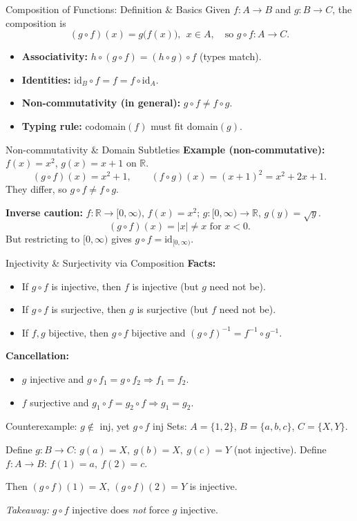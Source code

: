 \documentclass[11pt]{beamer}
\theoremstyle{plain}
\begin{document}
\begin{frame}{Composition of Functions: Definition \& Basics}
\small
Given $f:A\to B$ and $g:B\to C$, the composition is
\[
(g\circ f)(x)=g\bigl(f(x)\bigr),\ \ x\in A,\quad \text{so } g\circ f:A\to C.
\]
\begin{itemize}
  \item \textbf{Associativity:} $h\circ(g\circ f)=(h\circ g)\circ f$ (types match).
  \item \textbf{Identities:} $\mathrm{id}_B\circ f=f=f\circ\mathrm{id}_A$.
  \item \textbf{Non-commutativity (in general):} $g\circ f\neq f\circ g$.
  \item \textbf{Typing rule:} codomain$(f)$ must fit domain$(g)$.
\end{itemize}
\end{frame}
\begin{frame}{Non-commutativity \& Domain Subtleties}
\small
\textbf{Example (non-commutative):} $f(x)=x^2$, $g(x)=x+1$ on $\mathbb{R}$.
\[
(g\circ f)(x)=x^2+1,\qquad (f\circ g)(x)=(x+1)^2=x^2+2x+1.
\]
They differ, so $g\circ f\ne f\circ g$.

\medskip
\textbf{Inverse caution:} $f:\mathbb{R}\to[0,\infty)$, $f(x)=x^2$; $g:[0,\infty)\to\mathbb{R}$, $g(y)=\sqrt{y}$.
\[
(g\circ f)(x)=|x| \neq x \text{ for } x<0.
\]
But restricting to $[0,\infty)$ gives $g\circ f=\mathrm{id}_{[0,\infty)}$.
\end{frame}
\begin{frame}{Injectivity \& Surjectivity via Composition}
\small
\textbf{Facts:}
\begin{itemize}
  \item If $g\circ f$ is injective, then $f$ is injective (but $g$ need not be).
  \item If $g\circ f$ is surjective, then $g$ is surjective (but $f$ need not be).
  \item If $f,g$ bijective, then $g\circ f$ bijective and $(g\circ f)^{-1}=f^{-1}\circ g^{-1}$.
\end{itemize}

\textbf{Cancellation:}
\begin{itemize}
  \item $g$ injective and $g\circ f_1=g\circ f_2 \Rightarrow f_1=f_2$.
  \item $f$ surjective and $g_1\circ f=g_2\circ f \Rightarrow g_1=g_2$.
\end{itemize}
\end{frame}
\begin{frame}{Counterexample: $g\notin$ inj, yet $g\circ f$ inj}
\small
Sets: $A=\{1,2\}$, $B=\{a,b,c\}$, $C=\{X,Y\}$.

Define $g:B\to C$: $g(a)=X,\ g(b)=X,\ g(c)=Y$ (not injective).
Define $f:A\to B$: $f(1)=a,\ f(2)=c$.

Then $(g\circ f)(1)=X$, $(g\circ f)(2)=Y$ is injective.
\medskip

\textit{Takeaway:} $g\circ f$ injective does \emph{not} force $g$ injective.
\end{frame}
\end{document}
